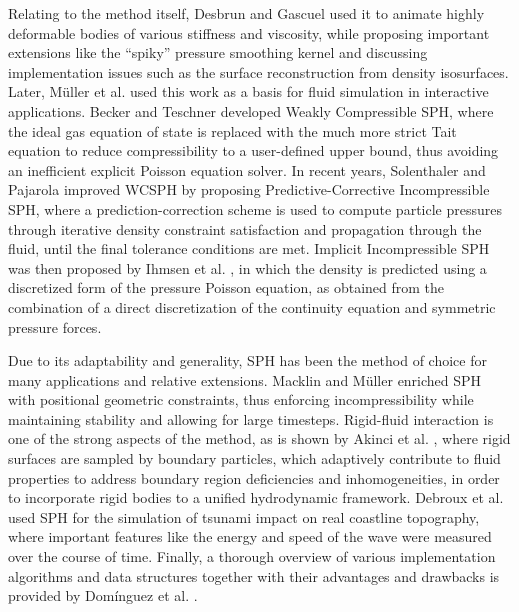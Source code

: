 \documentclass{llncs}
\begin{document}
Relating to the method itself, Desbrun and Gascuel \cite{desbrun1996smoothed} used it to
animate highly deformable bodies of various stiffness and viscosity, while proposing
important extensions like the ``spiky'' pressure smoothing kernel and discussing
implementation issues such as the surface reconstruction from density isosurfaces. Later,
M\"{u}ller et al. \cite{muller2003particle} used this work as a basis for fluid simulation
in interactive applications. Becker and Teschner \cite{becker2007weakly} developed Weakly
Compressible SPH, where the ideal gas equation of state is replaced with the much more
strict Tait equation to reduce compressibility to a user-defined upper bound, thus
avoiding an inefficient explicit Poisson equation solver. In recent years, Solenthaler and
Pajarola \cite{solenthaler2009predictive} improved WCSPH by proposing
Predictive-Corrective Incompressible SPH, where a prediction-correction scheme is used to
compute particle pressures through iterative density constraint satisfaction and
propagation through the fluid, until the final tolerance conditions are met. Implicit
Incompressible SPH was then proposed by Ihmsen et al. \cite{ihmsen2014implicit}, in which
the density is predicted using a discretized form of the pressure Poisson equation, as
obtained from the combination of a direct discretization of the continuity equation and
symmetric pressure forces.

Due to its adaptability and generality, SPH has been the method of choice for many
applications and relative extensions. Macklin and M\"{u}ller \cite{macklin2013position}
enriched SPH with positional geometric constraints, thus enforcing incompressibility while
maintaining stability and allowing for large timesteps. Rigid-fluid interaction is one of
the strong aspects of the method, as is shown by Akinci et al. \cite{akinci2012versatile},
where rigid surfaces are sampled by boundary particles, which adaptively contribute to
fluid properties to address boundary region deficiencies and inhomogeneities, in order to
incorporate rigid bodies to a unified hydrodynamic framework. Debroux et
al. \cite{debroux2001three} used SPH for the simulation of tsunami impact on real
coastline topography, where important features like the energy and speed of the wave were
measured over the course of time. Finally, a thorough overview of various implementation
algorithms and data structures together with their advantages and drawbacks is provided by
Dom\'{i}nguez et al. \cite{dominguez2011}.
\end{document}
